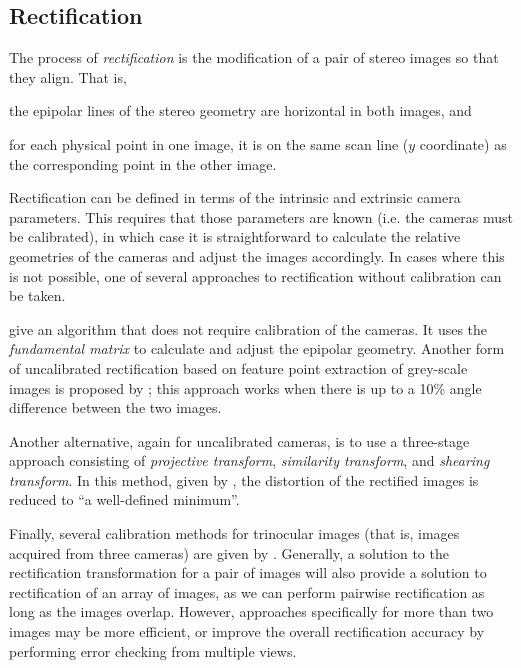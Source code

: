 \subsection{Rectification}
\label{sec:rectification-prior}

The process of \emph{rectification} is the modification of a pair of stereo images so that they align. That is, \begin{inparaenum}[(a)] \item the epipolar lines of the stereo geometry are horizontal in both images, and
\item for each physical point in one image, it is on the same scan line ($y$ coordinate) as the corresponding point in the other image. \end{inparaenum}

Rectification can be defined in terms of the intrinsic and extrinsic camera parameters. This requires that those parameters are known (i.e. the cameras must be calibrated), in which case it is straightforward to calculate the relative geometries of the cameras and adjust the images accordingly. In cases where this is not
possible, one of several approaches to rectification without calibration can be taken.

\citet{chen03} give an algorithm that does not require calibration of the cameras. It uses the \emph{fundamental matrix} to calculate and adjust the epipolar geometry. Another form of uncalibrated rectification based on feature point extraction of grey-scale images is proposed by
\citet{papadimitriou96:_epipol}; this approach works when there is up to a 10\% angle
difference between the two images.

Another alternative, again for uncalibrated cameras, is to use a three-stage approach consisting of \emph{projective transform}, \emph{similarity transform}, and \emph{shearing transform}. In this method, given by \citet{loop99:_comput}, the distortion of the rectified images is reduced to ``a well-defined minimum''.

Finally, several calibration methods for trinocular images (that is, images acquired from three cameras) are given by \citet{sun03:_uncal}. Generally, a solution to the rectification transformation for a pair of images will also provide a solution to rectification of an array of images, as we can perform pairwise rectification as long as the images overlap. However, approaches specifically for more than two images may be more efficient, or improve the overall rectification accuracy by performing error checking from multiple views.
